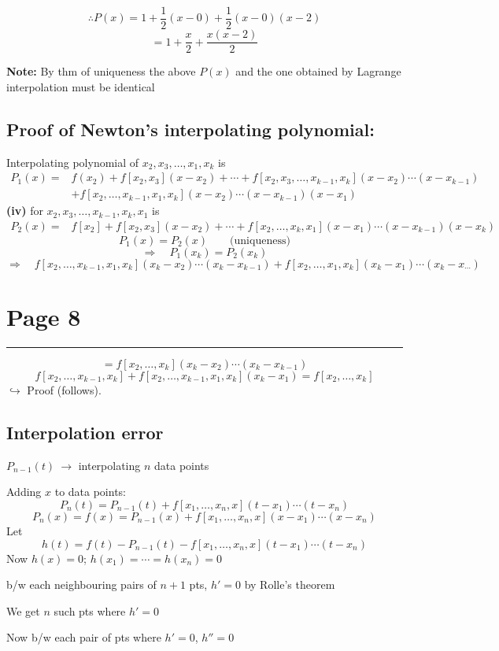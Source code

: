 \documentclass[11pt,a4paper]{article}
\newcommand{\pagehead}[1]{%
  \clearpage
  \section*{Page #1}
  \vspace{-0.6em}
  {\color{black!45}\rule{\linewidth}{0.5pt}}
  \vspace{0.4em}
}
\begin{document}
\[
\therefore P(x)=1+\frac12(x-0)+\frac12(x-0)(x-2)
\]
\[
=1+\frac{x}{2}+\frac{x(x-2)}{2}
\]

\textbf{Note:} By thm of uniqueness the above $P(x)$ and the one obtained by
Lagrange interpolation must be identical

\subsection*{Proof of Newton's interpolating polynomial:}

Interpolating polynomial of $x_2,x_3,\dots,x_1,x_k$ is
\[
\begin{aligned}
P_1(x)={}&f(x_2)+f[x_2,x_3](x-x_2)+\cdots
+f[x_2,x_3,\dots,x_{k-1},x_k](x-x_2)\cdots(x-x_{k-1})\\
&+f[x_2,\dots,x_{k-1},x_1,x_k](x-x_2)\cdots(x-x_{k-1})(x-x_1)
\end{aligned}
\]
\textbf{(iv)} for $x_2,x_3,\dots,x_{k-1},x_k,x_1$ is
\[
\begin{aligned}
P_2(x)={}&f[x_2]+f[x_2,x_3](x-x_2)+\cdots
+f[x_2,\dots,x_k,x_1](x-x_1)\cdots(x-x_{k-1})(x-x_k)
\end{aligned}
\]
\[
P_1(x)=P_2(x)\qquad\text{(uniqueness)}
\]
\[
\Rightarrow\quad P_1(x_k)=P_2(x_k)
\]
\[
\Rightarrow\quad f[x_2,\dots,x_{k-1},x_1,x_k](x_k-x_2)\cdots(x_k-x_{k-1})
+f[x_2,\dots,x_1,x_k](x_k-x_1)\cdots(x_k-x_{\cdots})
\]

\pagehead{8}

\[
=f[x_2,\dots,x_k](x_k-x_2)\cdots(x_k-x_{k-1})
\]
\[
f[x_2,\dots,x_{k-1},x_k]+f[x_2,\dots,x_{k-1},x_1,x_k](x_k-x_1)
=f[x_2,\dots,x_k]
\]
$\hookrightarrow$ Proof (follows).

\subsection*{Interpolation error}

$P_{n-1}(t)\ \to$ interpolating $n$ data points

Adding $x$ to data points:
\[
P_n(t)=P_{n-1}(t)+f[x_1,\dots,x_n,x](t-x_1)\cdots(t-x_n)
\]
\[
P_n(x)=f(x)=P_{n-1}(x)+f[x_1,\dots,x_n,x](x-x_1)\cdots(x-x_n)
\]
Let
\[
h(t)=f(t)-P_{n-1}(t)-f[x_1,\dots,x_n,x](t-x_1)\cdots(t-x_n)
\]
Now $h(x)=0$; $h(x_1)=\cdots=h(x_n)=0$

b/w each neighbouring pairs of $n+1$ pts, $h'=0$ by Rolle's theorem

We get $n$ such pts where $h'=0$

Now b/w each pair of pts where $h'=0$, $h''=0$
\end{document}
